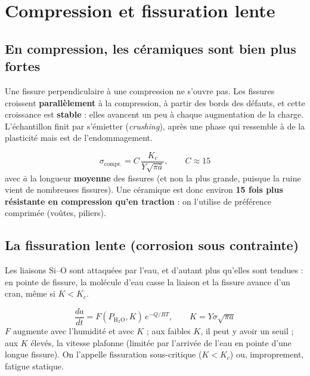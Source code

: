 \section{Compression et fissuration lente}

\subsection*{En compression, les céramiques sont bien plus fortes}


Une fissure perpendiculaire à une compression ne s'ouvre pas. Les fissures croissent
\textbf{parallèlement} à la compression, à partir des bords des défauts, et cette croissance est
\textbf{stable} : elles avancent un peu à chaque augmentation de la charge. L'échantillon finit
par s'émietter (\emph{crushing}), après une phase qui ressemble à de la plasticité mais est de
l'endommagement.

\begin{thmbox}[title={Résistance en compression}]
\[ \sigma_{\text{compr.}} = C\,\frac{K_c}{Y\sqrt{\pi\bar a}}, \qquad C \approx 15 \]
avec $\bar a$ la longueur \textbf{moyenne} des fissures (et non la plus grande, puisque la ruine
vient de nombreuses fissures). Une céramique est donc environ \textbf{15 fois plus résistante en
compression qu'en traction} : on l'utilise de préférence comprimée (voûtes, piliers).
\end{thmbox}

\subsection*{La fissuration lente (corrosion sous contrainte)}

Les liaisons Si--O sont attaquées par l'eau, et d'autant plus qu'elles sont tendues : en pointe
de fissure, la molécule d'eau casse la liaison et la fissure avance d'un cran, même si
$K < K_c$.


\begin{thmbox}[title={Loi de fissuration sous-critique (à connaître par c\oe ur)}]
\[ \frac{da}{dt} = F(P_{\text{H}_2\text{O}}, K)\,e^{-Q/RT}, \qquad K = Y\sigma\sqrt{\pi a} \]
$F$ augmente avec l'humidité et avec $K$ ; aux faibles $K$, il peut y avoir un seuil ; aux $K$
élevés, la vitesse plafonne (limitée par l'arrivée de l'eau en pointe d'une longue fissure).
On l'appelle \og fissuration sous-critique\fg{} ($K < K_c$) ou, improprement, \og fatigue
statique\fg{}.
\end{thmbox}

